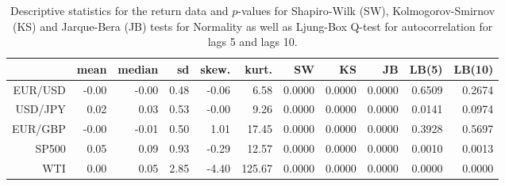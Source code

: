 \begin{table}[ht]
\centering
\begin{tabular}{rrrrrrrrrrr}
  \hline
 & mean & median & sd & skew. & kurt. & SW & KS & JB & LB(5) & LB(10) \\ 
  \hline
EUR/USD & -0.00 & -0.00 & 0.48 & -0.06 & 6.58 & 0.0000 & 0.0000 & 0.0000 & 0.6509 & 0.2674 \\ 
  USD/JPY & 0.02 & 0.03 & 0.53 & -0.00 & 9.26 & 0.0000 & 0.0000 & 0.0000 & 0.0141 & 0.0974 \\ 
  EUR/GBP & -0.00 & -0.01 & 0.50 & 1.01 & 17.45 & 0.0000 & 0.0000 & 0.0000 & 0.3928 & 0.5697 \\ 
  SP500 & 0.05 & 0.09 & 0.93 & -0.29 & 12.57 & 0.0000 & 0.0000 & 0.0000 & 0.0010 & 0.0013 \\ 
  WTI & 0.00 & 0.05 & 2.85 & -4.40 & 125.67 & 0.0000 & 0.0000 & 0.0000 & 0.0000 & 0.0000 \\ 
   \hline
\end{tabular}
\caption{Descriptive statistics for the return data and
              $p$-values for  Shapiro-Wilk (SW), Kolmogorov-Smirnov (KS) and 
             Jarque-Bera (JB) tests for Normality as well as Ljung-Box Q-test
             for autocorrelation for lags 5 and lags 10.} 
\label{table:rets_desc_EX}
\end{table}
